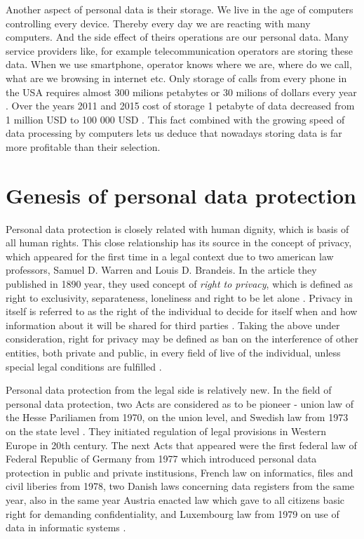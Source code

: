 \documentclass[en, noamssymb]{mgr}
\begin{document}
\indent Another aspect of personal data is their storage. We live in the age of computers controlling every device. Thereby every day we are reacting with many computers. And the side effect of theirs operations are our personal data. Many service providers like, for example telecommunication operators are storing these data. When we use smartphone, operator knows where we are, where do we call, what are we browsing in internet etc. Only storage of calls from every phone in the USA requires almost 300 milions petabytes or 30 milions of dollars every year \cite{dane_i_goliat}. Over the years 2011 and 2015 cost of storage 1 petabyte of data decreased from 1 million USD to 100 000 USD \cite{dane_i_goliat}. This fact combined with the growing speed of data processing by computers lets us deduce that nowadays storing data is far more profitable than their selection.



\section{Genesis of personal data protection}

Personal data protection is closely related with human dignity, which is basis of all human rights. This close relationship has its source in the concept of privacy, which appeared for the first time in a legal context due to two american law professors, Samuel D. Warren and Louis D. Brandeis. In the article they published in 1890 year, they used concept of \textit{right to privacy}, which is defined as right to exclusivity, separateness, loneliness and right to be let alone \cite{geneza_odo}. Privacy in itself is referred to as the right of the individual to decide for itself when and how information about it will be shared for third parties \cite{geneza_odo}. Taking the above under consideration, right for privacy may be defined as ban on the interference of other entities, both private and public, in every field of live of the individual, unless special legal conditions are fulfilled \cite{geneza_odo}.

\indent Personal data protection from the legal side is relatively new. In the field of personal data protection, two Acts are considered as to be pioneer - union law of the Hesse Pariliamen from 1970, on the union level, and Swedish law from 1973 on the state level \cite{prawo_odo}. They initiated regulation of legal provisions in Western Europe 
in 20th century. The next Acts that appeared were the first federal law of Federal Republic of Germany from 1977  which introduced personal data protection in public and private institusions, French law on informatics, files and civil liberies from 1978, two Danish laws concerning data registers from the same year, also in the same year Austria enacted law which gave to all citizens basic right for demanding confidentiality, and Luxembourg law from 1979 on use of data in informatic systems \cite{prawo_odo}.
\end{document}
